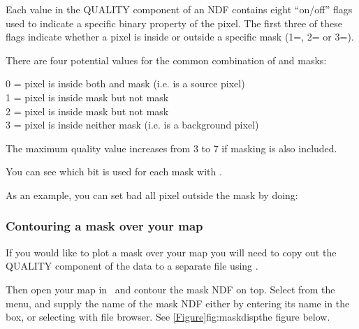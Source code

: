 \documentclass[11pt,oneside,chapters]{starlink}
\begin{document}

Each value in the QUALITY component of an NDF contains eight ``on/off''
flags used to indicate a specific binary property of the pixel. The
first three of these flags indicate whether a pixel is inside or outside a
specific mask (1=, 2= or 3=).

There are four potential values for the common combination of
 and  masks:

0 = pixel is inside both  and  mask (i.e. is a source pixel)\\
1 = pixel is inside  mask but not  mask\\
2 = pixel is inside  mask but not  mask\\
3 = pixel is inside neither mask (i.e. is a background pixel)


The maximum quality value increases from 3 to 7 if  masking
is also included.

You can see which bit is used for each mask with \showqual.
\begin{terminalv}
\end{terminalv}

As an example, you can set bad all pixel outside the  mask
by doing:
\begin{terminalv}
\end{terminalv}
\latex{\vspace{0.3cm}}

\subsubsection{Contouring a mask over your map}
If you would like to plot a mask over your map you will need to copy
out the QUALITY component of the data to a separate file using
.
\begin{terminalv}
\end{terminalv}
Then open your map in \gaia\ and contour the mask NDF on top.
Select  from the 
menu, and supply the name of the mask NDF either by entering its name in
the  box, or selecting with
 file browser. See
\cref{Figure}{fig:maskdisp}{the figure below}.
\end{document}
